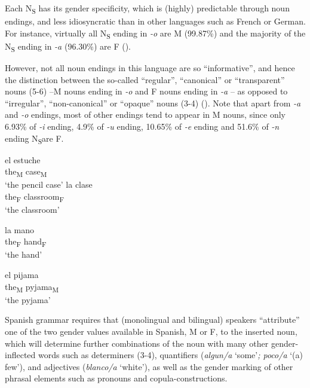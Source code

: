 \documentclass[output=paper]{langscibook}
\begin{document}
Each N\textsubscript{S} has its gender specificity, which is (highly) predictable through noun endings, and less idiosyncratic than in other languages such as French or German. For instance, virtually all N\textsubscript{S} ending in \textit{{}-o} are M (99.87\%) and the majority of the N\textsubscript{S} ending in \textit{{}-a} (96.30\%) are F (\citealt{Eddington2002,TeschnerRussell1984}).

However, not all noun endings in this language are so “informative”, and hence the distinction between the so-called “regular”, “canonical” or “transparent” nouns (5-6) –M nouns ending in \textit{-o} and F nouns ending in \textit{-a} –  as opposed to “irregular”, “non-canonical” or “opaque” nouns (3-4) (\citealt{CaffarraBarber2015,ViglioccoEtAl1997}). Note that apart from \textit{-a} and \textit{-o} endings, most of other endings tend to appear in M nouns, since only 6.93\% of \textit{-i} ending, 4.9\% of \textit{-u} ending, 10.65\% of \textit{-e} ending and 51.6\% of \textit{-n} ending N\textsubscript{S}are F.

\ea%
    \label{ex:ezeiza:3}
     \ea el   estuche\\
         the\textsubscript{M}  case\textsubscript{M}            \\
    ‘the pencil case’
    \ex la   clase\\
     the\textsubscript{F}  classroom\textsubscript{F}\\
     ‘the classroom’
    \z
\z

\ea%
    \label{ex:ezeiza:4}
    \ea la   mano                                          \\
         the\textsubscript{F}  hand\textsubscript{F}         \\
         \glt ‘the hand’

     \ex
     \gll el   pijama     \\
      the\textsubscript{M}  pyjama\textsubscript{M}     \\
     \glt ‘the pyjama’
    \z
\z

{Spanish grammar requires that (monolingual and bilingual) speakers “attribute” one of the two gender values available in Spanish, M or F, to the inserted noun, which will determine further combinations of the} {noun with many other gender-inflected words such as determiners (3-4), quantifiers (}{\textit{algun/a}} {‘some’}{\textit{; poco/a}} {‘(a) few’), and adjectives (}{\textit{blanco/a} } {‘white’), as well as the gender marking of other phrasal elements such as pronouns and copula-constructions.}
\end{document}

